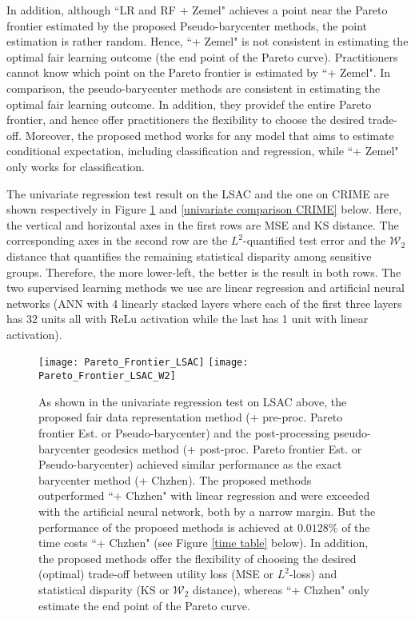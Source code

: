 \documentclass[twoside,11pt]{article}
\begin{document}
In addition, although ``LR and RF + Zemel" achieves a point near the Pareto frontier estimated by the proposed Pseudo-barycenter methods, the point estimation is rather random. Hence, ``+ Zemel" is not consistent in estimating the optimal fair learning outcome (the end point of the Pareto curve). Practitioners cannot know which point on the Pareto frontier is estimated by ``+ Zemel". In comparison, the pseudo-barycenter methods are consistent in estimating the optimal fair learning outcome. In addition, they providef the entire Pareto frontier, and hence offer practitioners the flexibility to choose the desired trade-off. Moreover, the proposed method works for any model that aims to estimate conditional expectation, including classification and regression, while ``+ Zemel" only works for classification.

The univariate regression test result on the LSAC and the one on CRIME are shown respectively in Figure \ref{univariate comparison LSAC} and \ref{univariate comparison CRIME} below. Here, the vertical and horizontal axes in the first rows are MSE and KS distance. The corresponding axes in the second row are the $L^2$-quantified test error and the $\mathcal{W}_2$ distance that quantifies the remaining statistical disparity among sensitive groups. Therefore, the more lower-left, the better is the result in both rows. The two supervised learning methods we use are linear regression and artificial neural networks (ANN with 4 linearly stacked layers where each of the first three layers has 32 units all with ReLu activation while the last has 1 unit with linear activation).

\begin{figure}[H]
\centering
\texttt{[image: Pareto\_Frontier\_LSAC]}\hfill
\texttt{[image: Pareto\_Frontier\_LSAC\_W2]}\hfill
\caption{As shown in the univariate regression test on LSAC above, the proposed fair data representation method (+ pre-proc. Pareto frontier Est. or Pseudo-barycenter) and the post-processing pseudo-barycenter geodesics method (+ post-proc. Pareto frontier Est. or Pseudo-barycenter) achieved similar performance as the exact barycenter method (+ Chzhen). The proposed methods outperformed ``+ Chzhen" with linear regression and were exceeded with the artificial neural network, both by a narrow margin. But the performance of the proposed methods is achieved at $0.0128 \%$ of the time costs ``+ Chzhen" (see Figure \ref{time table} below). In addition, the proposed methods offer the flexibility of choosing the desired (optimal) trade-off between utility loss (MSE or $L^2$-loss) and statistical disparity (KS or $\mathcal{W}_2$ distance), whereas ``+ Chzhen" only estimate the end point of the Pareto curve.}
\label{univariate comparison LSAC}
\end{figure}
\end{document}
